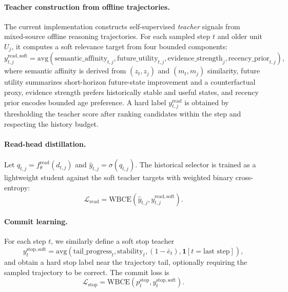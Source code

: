 \documentclass{article}
\newcommand{\sigmoid}{\sigma}
\newcommand{\Ind}{\mathbf{1}}
\begin{document}
\paragraph{Teacher construction from offline trajectories.}
The current implementation constructs self-supervised \emph{teacher} signals from mixed-source offline reasoning trajectories. For each sampled step $t$ and older unit $U_j$, it computes a soft relevance target from four bounded components:
\begin{equation}
 y_{t,j}^{\mathrm{read,soft}} =
 \mathrm{avg}\!\left(
 \mathrm{semantic\_affinity}_{t,j},
 \mathrm{future\_utility}_{t,j},
 \mathrm{evidence\_strength}_{j},
 \mathrm{recency\_prior}_{t,j}
 \right),
\label{eq:readteacher}
\end{equation}
where semantic affinity is derived from $(z_t,z_j)$ and $(m_t,m_j)$ similarity, future utility summarizes short-horizon future-state improvement and a counterfactual proxy, evidence strength prefers historically stable and useful states, and recency prior encodes bounded age preference. A hard label $y_{t,j}^{\mathrm{read}}$ is obtained by thresholding the teacher score after ranking candidates within the step and respecting the history budget.

\paragraph{Read-head distillation.}
Let $q_{t,j}=f_\theta^{\mathrm{read}}(d_{t,j})$ and $\hat y_{t,j}=\sigmoid(q_{t,j})$. The historical selector is trained as a lightweight student against the soft teacher targets with weighted binary cross-entropy:
\begin{equation}
\mathcal{L}_{\mathrm{read}} =
\mathrm{WBCE}\!\left(\hat y_{t,j}, y_{t,j}^{\mathrm{read,soft}}\right).
\label{eq:lread}
\end{equation}

\paragraph{Commit learning.}
For each step $t$, we similarly define a soft stop teacher
\begin{equation}
 y_t^{\mathrm{stop,soft}} =
 \mathrm{avg}\!\left(
 \mathrm{tail\_progress}_t,
 \mathrm{stability}_t,
 (1-\bar e_t),
 \Ind[t=\text{last step}]
 \right),
\label{eq:stoptarget}
\end{equation}
and obtain a hard stop label near the trajectory tail, optionally requiring the sampled trajectory to be correct. The commit loss is
\begin{equation}
\mathcal{L}_{\mathrm{stop}} =
\mathrm{WBCE}\!\left(p_t^{\mathrm{stop}}, y_t^{\mathrm{stop,soft}}\right).
\label{eq:lstop}
\end{equation}
\end{document}
